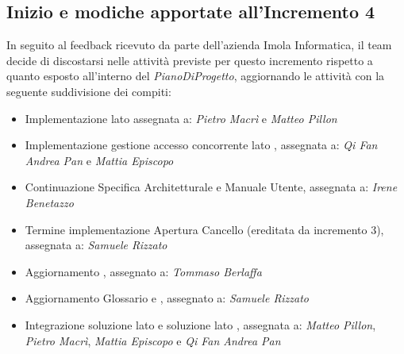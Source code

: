 \subsection{Inizio e modiche apportate all'Incremento 4}
In seguito al feedback ricevuto da parte dell'azienda Imola Informatica, il team decide di discostarsi nelle attività previste per questo incremento rispetto a quanto esposto all'interno del \textit{PianoDiProgetto}, aggiornando le attività con la seguente suddivisione dei compiti:
\begin{itemize}
  \item Implementazione  lato  assegnata a: 
    \subitem\textit{Pietro Macrì} e \textit{Matteo Pillon}
  \item Implementazione gestione accesso concorrente lato , assegnata a: 
    \subitem \textit{Qi Fan Andrea Pan} e \textit{Mattia Episcopo}
  \item Continuazione Specifica Architetturale e Manuale Utente, assegnata a:
    \subitem\textit{Irene Benetazzo}
  \item Termine implementazione Apertura Cancello (ereditata da incremento 3), assegnata a: 
    \subitem\textit{Samuele Rizzato}
  \item Aggiornamento , assegnato a: 
    \subitem\textit{Tommaso Berlaffa}
  \item Aggiornamento Glossario e , assegnato a: 
    \subitem\textit{Samuele Rizzato}
  \item Integrazione soluzione lato  e soluzione lato , assegnata a: 
    \subitem \textit{Matteo Pillon}, \textit{Pietro Macrì}, \textit{Mattia Episcopo} e \textit{Qi Fan Andrea Pan}
\end{itemize}
\newpage


